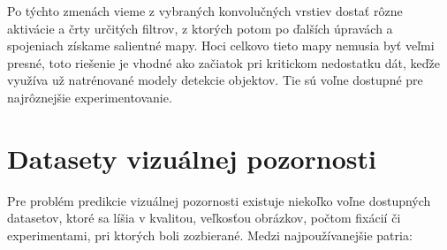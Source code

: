Po týchto zmenách vieme z vybraných konvolučných vrstiev dostať rôzne aktivácie a črty určitých filtrov, z ktorých potom po ďalších úpravách a spojeniach získame salientné mapy. Hoci celkovo tieto mapy nemusia byť veľmi presné, toto riešenie je vhodné ako začiatok pri kritickom nedostatku dát, keďže využíva už natrénované modely detekcie objektov. Tie sú voľne dostupné pre najrôznejšie experimentovanie. 


\newpage
\null
\thispagestyle{empty}
\newpage

\section{Datasety vizuálnej pozornosti}
\label{datasets}
Pre problém predikcie vizuálnej pozornosti existuje niekoľko voľne dostupných datasetov, ktoré sa líšia v kvalitou, veľkosťou obrázkov, počtom fixácií či experimentami, pri ktorých boli zozbierané. Medzi najpoužívanejšie patria:

